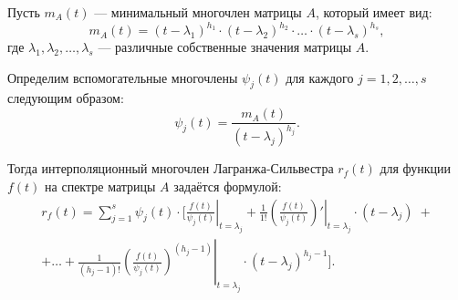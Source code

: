 \begin{shth}
    \begin{theorem}
    \leavevmode \nl 
    
    Пусть \( m_A(t) \) — минимальный многочлен матрицы \( A \), который имеет вид:
    \[
    m_A(t) = (t - \lambda_1)^{h_1} \cdot (t - \lambda_2)^{h_2} \cdot \ldots \cdot (t - \lambda_s)^{h_s},
    \]
    где \( \lambda_1, \lambda_2, \ldots, \lambda_s \) — различные собственные значения матрицы \( A \).

    Определим вспомогательные многочлены \( \psi_j(t) \) для каждого \( j = 1, 2, \ldots, s \) следующим образом:
    \[
    \psi_j(t) = \frac{m_A(t)}{(t - \lambda_j)^{h_j}}.
    \]

    Тогда интерполяционный многочлен Лагранжа-Сильвестра \( r_f(t) \) для функции \( f(t) \) на спектре матрицы \( A \) задаётся формулой:
    \begin{multline*}
    r_f(t) = \sum_{j=1}^s \psi_j(t) \cdot \Bigg[ \left. \frac{f(t)}{\psi_j(t)} \right|_{t = \lambda_j} + \frac{1}{1!} \left. \left( \frac{f(t)}{\psi_j(t)} \right)' \right|_{t = \lambda_j} \cdot (t - \lambda_j) \; + \\
    + \ldots + \frac{1}{(h_j - 1)!} \left. \left( \frac{f(t)}{\psi_j(t)} \right)^{(h_j - 1)} \right|_{t = \lambda_j} \cdot (t - \lambda_j)^{h_j - 1} \Bigg].
    \end{multline*}
    \end{theorem}
\end{shth}

